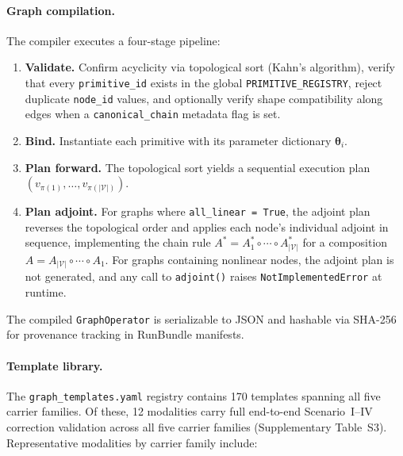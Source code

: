 \documentclass[11pt]{article}
\begin{document}
\paragraph{Graph compilation.}
The compiler executes a four-stage pipeline:
\begin{enumerate}
  \item \textbf{Validate.}  Confirm acyclicity via topological sort
    (Kahn's algorithm), verify that every \texttt{primitive\_id}
    exists in the global \texttt{PRIMITIVE\_REGISTRY}, reject
    duplicate \texttt{node\_id} values, and optionally verify shape
    compatibility along edges when a \texttt{canonical\_chain}
    metadata flag is set.
  \item \textbf{Bind.}  Instantiate each primitive with its parameter
    dictionary $\boldsymbol{\theta}_i$.
  \item \textbf{Plan forward.}  The topological sort yields a sequential
    execution plan $(v_{\pi(1)}, \ldots, v_{\pi(|\mathcal{V}|)})$.
  \item \textbf{Plan adjoint.}  For graphs where
    \texttt{all\_linear = True}, the adjoint plan reverses the
    topological order and applies each node's individual adjoint in
    sequence, implementing the chain rule $A^* = A_1^*
    \circ \cdots \circ A_{|\mathcal{V}|}^*$ for a composition $A = A_{|\mathcal{V}|}
    \circ \cdots \circ A_1$.  For graphs containing nonlinear nodes,
    the adjoint plan is not generated, and any call to
    \texttt{adjoint()} raises \texttt{NotImplementedError} at runtime.
\end{enumerate}
The compiled \texttt{GraphOperator} is serializable to JSON and hashable
via SHA-256 for provenance tracking in RunBundle manifests.

\paragraph{Template library.}
The \texttt{graph\_templates.yaml} registry contains 170 templates
spanning all five carrier families. Of these, 12 modalities carry full
end-to-end Scenario~I--IV correction validation across all five carrier
families (Supplementary Table~S3). Representative modalities by carrier family include:
\end{document}
